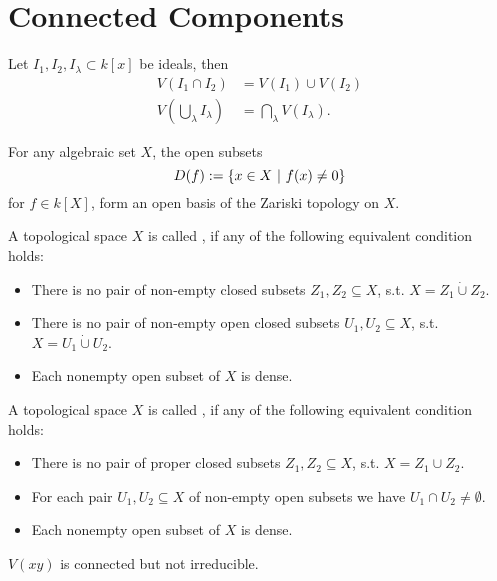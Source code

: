 \section{Connected Components}

\begin{lemma}
	Let $I_1, I_2, I_\lambda \subset k[x]$ be ideals, then
	\begin{align*}
	V(I_1 \cap I_2) &= V(I_1) \cup V(I_2)\\
	 V(\bigcup_\lambda I_\lambda) &= \bigcap_\lambda V(I_\lambda).
	\end{align*}
\end{lemma}
\begin{lemma}
	For any algebraic set $X$, the open subsets
	\[ D(f) := \left\lbrace x \in X ~ | ~ f(x) \neq 0\right\rbrace \]
	for $f \in k[X]$, form an open basis of the Zariski topology on $X$.
\end{lemma}

\begin{definition}
	A topological space $X$ is  called , if any of the following equivalent condition holds:
	\begin{itemize}
		\item There is no pair of non-empty closed subsets $Z_1,Z_2 \subseteq X$, s.t. $X = Z_1 \dot{\cup} Z_2$.
		\item There is no pair of non-empty open closed subsets $U_1,U_2 \subseteq X$, s.t. $X = U_1 \dot{\cup} U_2$.
		\item Each nonempty open subset of $X$ is dense.
	\end{itemize}
\end{definition}

\begin{definition}
	A topological space $X$ is  called , if any of the following equivalent condition holds:
	\begin{itemize}
		\item There is no pair of proper closed subsets $Z_1,Z_2 \subseteq X$, s.t. $X = Z_1 \cup Z_2$.
		\item For each pair $U_1,U_2 \subseteq X$ of non-empty open subsets we have $U_1\cap U_2 \neq \emptyset$.
		\item Each nonempty open subset of $X$ is dense.
	\end{itemize}
\end{definition}

\begin{example}
	$V(xy)$ is connected but not irreducible.
\end{example}